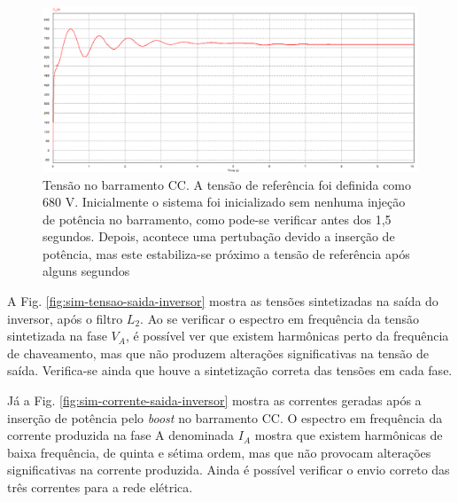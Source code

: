 \begin{figure}[!hbt]
	\begin{center}
    \includegraphics[width=\textwidth]{figuras/sim_figures/inversor_e_boost/tensao_barramento.PNG}
    \caption{Tensão no barramento CC. A tensão de referência foi definida como 680 V. Inicialmente o sistema foi inicializado sem nenhuma injeção de potência no barramento, como pode-se verificar antes dos 1,5 segundos. Depois, acontece uma pertubação devido a inserção de potência, mas este estabiliza-se próximo a tensão de referência após alguns segundos}
    \label{fig:sim-tensao-barramento}
    \end{center}
\end{figure}

A Fig. \ref{fig:sim-tensao-saida-inversor} mostra as tensões sintetizadas na saída do inversor, após o filtro $L_2$.
Ao se verificar o espectro em frequência da tensão sintetizada na fase $V_A$, é possível ver que existem harmônicas 
perto da frequência de chaveamento, mas que não produzem alterações significativas na tensão de saída. 
Verifica-se ainda que houve a sintetização correta das tensões em cada fase.

Já a Fig. \ref{fig:sim-corrente-saida-inversor} mostra as correntes geradas após a inserção de potência 
pelo \textit{boost} no barramento CC.
O espectro em frequência da corrente produzida na fase A denominada $I_A$ mostra que existem 
harmônicas de baixa frequência, de quinta e sétima ordem, mas que não provocam alterações 
significativas na corrente produzida. Ainda é possível verificar o envio correto das três 
correntes para a rede elétrica.

